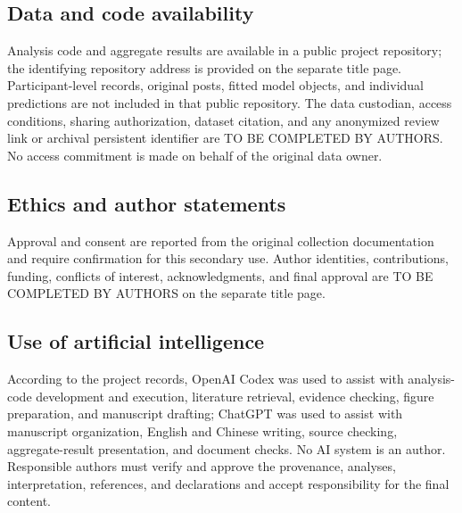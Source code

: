 \subsection{Data and code availability}
Analysis code and aggregate results are available in a public project repository; the identifying repository address is provided on the separate title page. Participant-level records, original posts, fitted model objects, and individual predictions are not included in that public repository. The data custodian, access conditions, sharing authorization, dataset citation, and any anonymized review link or archival persistent identifier are TO BE COMPLETED BY AUTHORS. No access commitment is made on behalf of the original data owner.

\subsection{Ethics and author statements}
Approval and consent are reported from the original collection documentation and require confirmation for this secondary use. Author identities, contributions, funding, conflicts of interest, acknowledgments, and final approval are TO BE COMPLETED BY AUTHORS on the separate title page.

\subsection{Use of artificial intelligence}
According to the project records, OpenAI Codex was used to assist with analysis-code development and execution, literature retrieval, evidence checking, figure preparation, and manuscript drafting; ChatGPT was used to assist with manuscript organization, English and Chinese writing, source checking, aggregate-result presentation, and document checks. No AI system is an author. Responsible authors must verify and approve the provenance, analyses, interpretation, references, and declarations and accept responsibility for the final content.

\FloatBarrier


